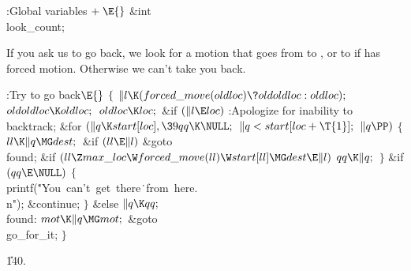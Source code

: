 \B{}:Global variables\X${}\mathrel+\E{}$\6
\&{int} \\{look\_count};\par
\fi

If you ask us to go back, we look for a motion that goes
from 
to , or to  if  has forced
motion.
Otherwise we can't take you back.

\Y\B\4:Try to go back\X${}\E{}$\6
${}\{{}$\1\6
${}\|l\K(\\{forced\_move}(\\{oldloc})\?\\{oldoldloc}:\\{oldloc});{}$\6
${}\\{oldoldloc}\K\\{oldloc};{}$\6
${}\\{oldloc}\K\\{loc};{}$\6
\&{if} ${}(\|l\E\\{loc}){}$\1\5
:Apologize for inability to backtrack\X;\2\6
\&{for} ${}(\|q\K\\{start}[\\{loc}],\39\\{qq}\K\NULL;{}$ ${}\|q<\\{start}[%
\\{loc}+\T{1}];{}$ ${}\|q\PP){}$\5
${}\{{}$\1\6
${}\\{ll}\K\|q\MG\\{dest};{}$\6
\&{if} ${}(\\{ll}\E\|l){}$\1\5
\&{goto} \\{found};\2\6
\&{if} ${}(\\{ll}\Z\\{max\_loc}\W\\{forced\_move}(\\{ll})\W\\{start}[\\{ll}]\MG%
\\{dest}\E\|l){}$\1\5
${}\\{qq}\K\|q;{}$\2\6
\4${}\}{}$\2\6
\&{if} ${}(\\{qq}\E\NULL){}$\5
${}\{{}$\1\6
\\{printf}(\.{"You\ can't\ get\ there}\)\.{\ from\ here.\\n"});\5
\&{continue};\6
\4${}\}{}$\2\6
\&{else}\1\5
${}\|q\K\\{qq};{}$\2\6
\4\\{found}:\5
${}\\{mot}\K\|q\MG\\{mot};{}$\6
\&{goto} \\{go\_for\_it};\6
\4${}\}{}$\2\par
\U140.\fi

